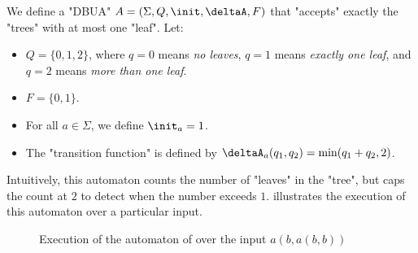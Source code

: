 \documentclass[a4paper,UKenglish,cleveref, autoref, thm-restate]{lipics-v2021}
\begin{document}
\begin{example}\label{ex:count-leaves}
	We define a "DBUA" $A = (\Sigma, Q, \init, \deltaA, F)$ that "accepts" exactly the "trees" with at most one "leaf". Let:
	\begin{itemize}
		\item $Q = \{0,1,2\}$, where $q=0$ means \textit{no leaves}, $q=1$ means \textit{exactly one leaf},
		      and $q=2$ means \textit{more than one leaf}.
		\item $F = \{0,1\}$.
		\item For all $a \in \Sigma$, we define $\init_a = 1$.
		\item The "transition function" is defined by $\deltaA_a(q_1, q_2) = \min(q_1 + q_2, 2)$.
	\end{itemize}

	Intuitively, this automaton counts the number of "leaves" in the "tree", but caps the count at $2$ to detect when the number exceeds $1$.
	 illustrates the execution of this automaton over a particular input.
\end{example}


\begin{figure}[h] 
	\centering
	\caption{Execution of the automaton of  over the input $a(b,a(b,b))$}\label{fig:count-leaves}
\end{figure}
\end{document}

